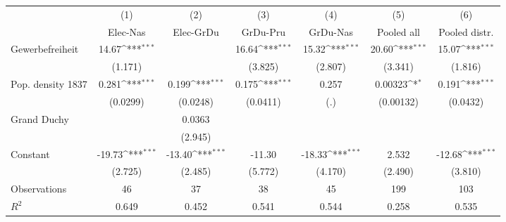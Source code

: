 {
\def\sym#1{\ifmmode^{#1}\else\(^{#1}\)\fi}
\begin{tabular}{l*{6}{c}}
\hline\hline
                    &\multicolumn{1}{c}{(1)}&\multicolumn{1}{c}{(2)}&\multicolumn{1}{c}{(3)}&\multicolumn{1}{c}{(4)}&\multicolumn{1}{c}{(5)}&\multicolumn{1}{c}{(6)}\\
                    &\multicolumn{1}{c}{\footnotesize Elec-Nas}&\multicolumn{1}{c}{\footnotesize  Elec-GrDu}&\multicolumn{1}{c}{\footnotesize  GrDu-Pru}&\multicolumn{1}{c}{\footnotesize  GrDu-Nas}&\multicolumn{1}{c}{\footnotesize  Pooled all}&\multicolumn{1}{c}{\footnotesize  Pooled distr.}\\
\hline
Gewerbefreiheit     &       14.67\sym{***}&                     &       16.64\sym{***}&       15.32\sym{***}&       20.60\sym{***}&       15.07\sym{***}\\
                    &     (1.171)         &                     &     (3.825)         &     (2.807)         &     (3.341)         &     (1.816)         \\
[1em]
Pop. density 1837   &       0.281\sym{***}&       0.199\sym{***}&       0.175\sym{***}&       0.257         &     0.00323\sym{*}  &       0.191\sym{***}\\
                    &    (0.0299)         &    (0.0248)         &    (0.0411)         &         (.)         &   (0.00132)         &    (0.0432)         \\
[1em]
Grand Duchy         &                     &      0.0363         &                     &                     &                     &                     \\
                    &                     &     (2.945)         &                     &                     &                     &                     \\
[1em]
Constant            &      -19.73\sym{***}&      -13.40\sym{***}&      -11.30         &      -18.33\sym{***}&       2.532         &      -12.68\sym{***}\\
                    &     (2.725)         &     (2.485)         &     (5.772)         &     (4.170)         &     (2.490)         &     (3.810)         \\
\hline
Observations        &          46         &          37         &          38         &          45         &         199         &         103         \\
\(R^{2}\)           &       0.649         &       0.452         &       0.541         &       0.544         &       0.258         &       0.535         \\
\hline\hline
\end{tabular}
}
